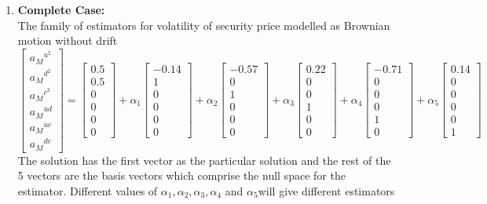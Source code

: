 \documentclass[12pt]{article}   	%
\begin{document}
\begin{enumerate}
\item \textbf{Complete Case:}\\
The family of estimators for volatility of security price modelled as Brownian motion without drift
$$\begin{bmatrix}
{a_{M}}^{u^2}\\
{a_{M}}^{d^2}\\
{a_{M}}^{c^2}\\
{a_{M}}^{ud}\\
{a_{M}}^{uc}\\
{a_{M}}^{dc}
\end{bmatrix}=
\begin{bmatrix}
0.5\\
0.5\\
0\\
0\\
0\\
0
\end{bmatrix}+\alpha_1
\begin{bmatrix}
-0.14\\
1\\
0\\
0\\
0\\
0
\end{bmatrix}+\alpha_2
\begin{bmatrix}
-0.57\\
0\\
1\\
0\\
0\\
0
\end{bmatrix}
+\alpha_3
\begin{bmatrix}
0.22\\
0\\
0\\
1\\
0\\
0
\end{bmatrix}
+\alpha_4
\begin{bmatrix}
-0.71\\
0\\
0\\
0\\
1\\
0
\end{bmatrix}
+\alpha_5
\begin{bmatrix}
0.14\\
0\\
0\\
0\\
0\\
1
\end{bmatrix}
 $$
 The solution has the first vector as the particular solution and the rest of the 5 vectors are the basis vectors which comprise the null space for the estimator. 
 Different values of $\alpha_1,\alpha_2, \alpha_3, \alpha_4 $ and $\alpha_5 $will give different estimators\\
 

\end{enumerate}
\end{document}
